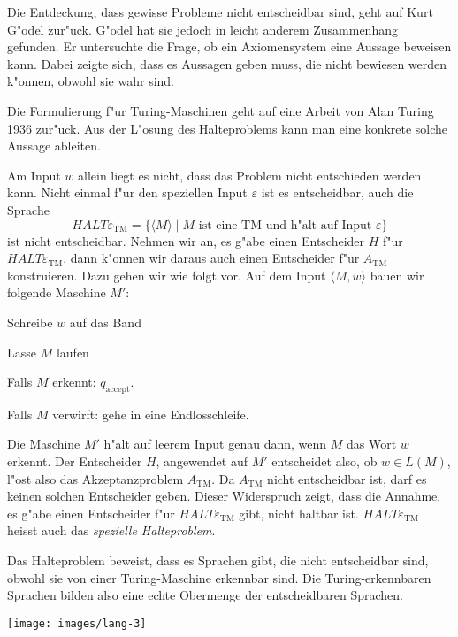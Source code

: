 %
Die Entdeckung, dass gewisse Probleme nicht entscheidbar sind,
geht auf Kurt G"odel zur"uck.
G"odel hat sie jedoch in leicht anderem Zusammenhang gefunden.
Er untersuchte die Frage, ob ein
Axiomensystem eine Aussage beweisen kann.
Dabei zeigte sich,
dass es Aussagen geben muss, die nicht bewiesen werden k"onnen,
obwohl sie wahr sind.

Die Formulierung f"ur Turing-Maschinen geht auf eine Arbeit von
Alan Turing 1936 zur"uck.
%
Aus der L"osung des Halteproblems kann
man eine konkrete solche Aussage ableiten.

Am Input $w$ allein liegt es nicht, dass das Problem nicht
entschieden werden kann.
Nicht einmal f"ur den speziellen Input $\varepsilon$ ist es
entscheidbar, auch die Sprache
\[
\textit{HALT}\varepsilon_{\text{TM}}
=\{
\langle M\rangle \;|\;
\text{$M$ ist eine TM und h"alt auf Input $\varepsilon$}
\}
\]
%
ist nicht entscheidbar.
Nehmen wir an, es g"abe einen
Entscheider $H$ f"ur $\textit{HALT}\varepsilon_{\text{TM}}$, dann k"onnen wir daraus
auch einen Entscheider f"ur $A_{\text{TM}}$ konstruieren.
Dazu gehen wir wie folgt vor.
Auf dem Input $\langle M,w\rangle$ bauen wir folgende Maschine $M'$:
\medskip
\begin{compactenum}
\item Schreibe $w$ auf das Band
\item Lasse $M$ laufen
\item Falls $M$ erkennt: $q_{\text{accept}}$.
\item Falls $M$ verwirft: gehe in eine Endlosschleife.
\end{compactenum}
\medskip
Die Maschine $M'$ h"alt auf leerem Input genau dann, wenn $M$
das Wort $w$ erkennt.
Der Entscheider $H$, angewendet auf $M'$
entscheidet also, ob $w\in L(M)$, l"ost also das Akzeptanzproblem
$A_{\text{TM}}$.
Da $A_{\text{TM}}$ nicht entscheidbar ist, darf es keinen solchen
Entscheider geben.
Dieser Widerspruch zeigt, dass die Annahme, es
g"abe einen Entscheider f"ur $\textit{HALT}\varepsilon_{\text{TM}}$ gibt,
nicht haltbar ist.
$\textit{HALT}\varepsilon_{\text{TM}}$ heisst
auch das {\em spezielle Halteproblem}.
%

Das Halteproblem beweist, dass es Sprachen gibt, die nicht
entscheidbar sind, obwohl sie von einer Turing-Maschine
erkennbar sind.
Die Turing-erkennbaren Sprachen bilden also eine
echte Obermenge der entscheidbaren Sprachen.
\begin{center}
\texttt{[image: images/lang-3]}
\end{center}

